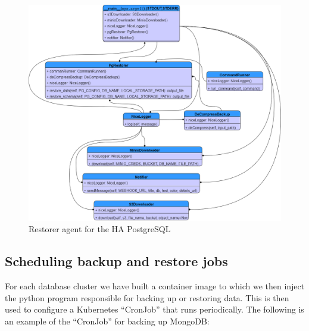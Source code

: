 \begin{figure}[H]\centering
\includegraphics[width=1.0\textwidth,angle=00]{assets/f61.png}
\caption{Restorer agent for the HA PostgreSQL }
\label{fig:f61}
\end{figure}

\subsection{ Scheduling backup and restore jobs }

For each database cluster we have built a container image to which we then inject the python program responsible for backing up or restoring data. This is then used to configure a Kubernetes “CronJob” that runs periodically. The following is an example of the “CronJob” for backing up MongoDB: 



